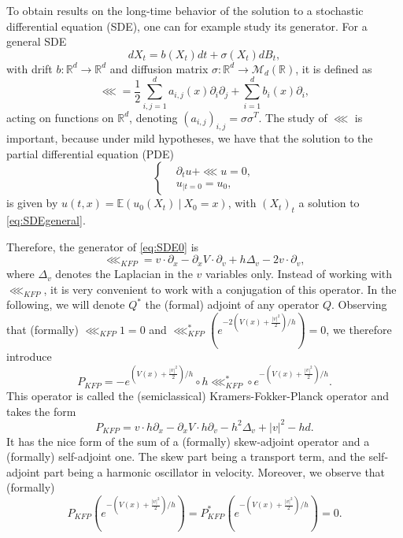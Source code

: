 \documentclass[12pt]{amsart}
\newcommand{\E}{\mathbb E}
\newcommand{\R}{\mathbb R}
\numberwithin{equation}{section}
\numberwithin{figure}{section}
\def\mmm{{\mathcal M}}\def\nnn{{\mathcal N}} \def\ooo{{\mathcal O}}\def\ppp{{\mathcal P}}
\begin{document}
To obtain results on the long-time behavior of the solution to a stochastic differential equation (SDE), one can for example study its generator. For a general SDE
\begin{equation}\label{eq:SDEgeneral}
dX_t = b(X_t)dt + \sigma(X_t)dB_t,
\end{equation}
with drift $b:\R^d\to\R^d$ and diffusion matrix $\sigma:\R^d\to\mmm_d(\R)$, it is defined as
\begin{equation*}
\lll = \frac12\sum_{i,j=1}^da_{i,j}(x)\partial_i\partial_j + \sum_{i=1}^db_i(x)\partial_i,
\end{equation*}
acting on functions on $\R^d$, denoting $(a_{i,j})_{i,j} = \sigma\sigma^T$. The study of $\lll$ is important, because under mild hypotheses, we have that the solution to the partial differential equation (PDE)
\begin{equation}\label{eq:FeynmanKac}
\left\{
\begin{aligned}
&\partial_tu+\lll u = 0,\\
&u_{|t=0}=u_0,
\end{aligned}
\right.
\end{equation}
is given by $u(t,x) = \E(u_0(X_t)\ |\ X_0=x)$, with $(X_t)_t$ a solution to \eqref{eq:SDEgeneral}.

Therefore, the generator of \eqref{eq:SDE0} is
\begin{equation*}
\lll_{KFP} = v\cdot \partial_x - \partial_x V\cdot \partial_v + h\Delta_v - 2v\cdot\partial_v,
\end{equation*}
where $\Delta_v$ denotes the Laplacian in the $v$ variables only. Instead of working with $\lll_{KFP}$, it is very convenient to work with a conjugation of this operator. In the following, we will denote $Q^*$ the (formal) adjoint of any operator $Q$. Observing that (formally) $\lll_{KFP}1=0$ and $\lll_{KFP}^*(e^{-2(V(x) + \frac{|v|^2}{2})/h})=0$, we therefore introduce
\begin{equation*}
P_{KFP} = -e^{(V(x) + \frac{|v|^2}{2})/h}\circ h\lll_{KFP}^*\circ e^{-(V(x) + \frac{|v|^2}{2})/h}.
\end{equation*}
This operator is called the (semiclassical) Kramers-Fokker-Planck operator and takes the form
\begin{equation}\label{eq:standardKFP}
P_{KFP} = v\cdot h\partial_x - \partial_x V\cdot h\partial_v - h^2\Delta_v + |v|^2 - hd.
\end{equation}
It has the nice form of the sum of a (formally) skew-adjoint operator and a (formally) self-adjoint one. The skew part being a transport term, and the self-adjoint part being a harmonic oscillator in velocity. Moreover, we observe that (formally)
\begin{equation*}
P_{KFP}(e^{-(V(x) + \frac{|v|^2}{2})/h}) = P_{KFP}^*(e^{-(V(x) + \frac{|v|^2}{2})/h}) = 0.
\end{equation*}
\end{document}
